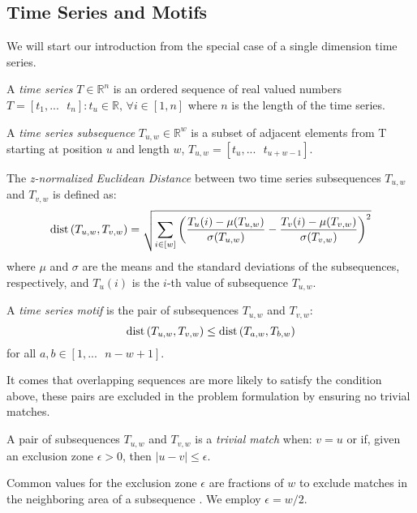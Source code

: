 \subsection{Time Series and Motifs}
We will start our introduction from the special case of a single dimension time series.
\begin{definition}
        \textup{A} \textit{time series} $T\in \mathbb{R} ^n$ \textup{is an ordered sequence of real valued numbers} $T = [t_1,...\text{ }t_n]: t_u\in \mathbb{R} \text{, }\forall i\in[1,n]$ \textup{where $n$ is the length of the time series}.
\end{definition}
\begin{definition}
    \textup{A \textit{time series subsequence} $T_{u,w}\in \mathbb{R}^w$ is a subset of adjacent elements from T starting at position $u$ and length $w$, $T_{u,w}=[t_u,...\text{ }t_{u+w-1}]$.
    }
\end{definition}
\begin{definition}
    The \textit{z-normalized Euclidean Distance} between two time series subsequences $T_{u,w}$ and $T_{v,w}$ is defined as:
    \begin{equation}
    \label{eq:zned}
    \operatorname{dist}\left(T_{u,w},T_{v,w}\right) = 
    \sqrt{\sum_{i\in[w]}
        \left( \frac{T_{u}(i)-\mu(T_{u,w})}{\sigma(T_{u,w})}
        -
        \frac{T_{v}(i)-\mu(T_{v,w})}{\sigma(T_{v,w})} \right)^2
    }
    \end{equation}
    where $\mu$ and $\sigma$ are the means and the standard deviations of the subsequences, respectively, and $T_{u}(i)$ is the $i$-th value of subsequence $T_{u,w}$.
\end{definition}
\begin{definition}
    \textup{A \textit{time series motif} is the pair of subsequences $T_{u,w}$ and $T_{v,w}$: \begin{equation*}
        \operatorname{dist}\left(T_{u,w},T_{v,w}\right)\leq \operatorname{dist}\left(T_{a,w},T_{b,w}\right)
    \end{equation*} for all $a,b \in [1,...\text{ }n-w+1]$.
    }
\end{definition}
It comes that overlapping sequences are more likely to satisfy the condition above, these pairs are excluded in the problem formulation by ensuring no trivial matches.
\begin{definition}
    A pair of subsequences $T_{u,w}$ and $T_{v,w}$ is a \textit{trivial match} when: $v=u$ or 
        if, given an exclusion zone $\epsilon>0$, then $|u-v|\le\epsilon$. 
\end{definition}
Common values for the exclusion zone $\epsilon$ are fractions of $w$ to exclude matches in the neighboring area of a subsequence \cite{mp1,mp2}. We employ $\epsilon=w/2$.

